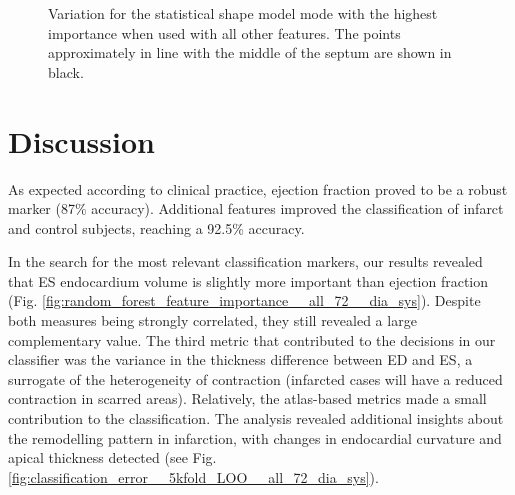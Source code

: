 \documentclass{llncs}
\begin{document}
	\begin{figure}[]		
\begin{center}   
\qquad
{}


\caption{ Variation for the statistical shape model mode with the highest importance when used with all other features. The points approximately in line with the middle of the septum are shown in black. }
\label{fig:visualise_shapes}
\end{center}
		\end{figure}

\section{Discussion}

As expected according to clinical practice, ejection fraction proved to be a robust marker (87\% accuracy). Additional features improved the classification of infarct and control subjects, reaching a 92.5\% accuracy. 

In the search for the most relevant classification markers, our results revealed that ES endocardium volume is slightly more important than ejection fraction (Fig. \ref{fig:random_forest_feature_importance__all_72__dia_sys}). Despite both measures being strongly correlated, they still revealed a large complementary value. The third metric that contributed to the decisions in our classifier was the variance in the thickness difference between ED and ES, a surrogate of the heterogeneity of contraction (infarcted cases will have a reduced contraction in scarred areas). Relatively, the atlas-based metrics made a small contribution to the classification. The analysis revealed additional insights about the remodelling pattern in infarction, with changes in endocardial curvature and apical thickness detected (see Fig. \ref{fig:classification_error__5kfold_LOO__all_72_dia_sys}).
\end{document}

